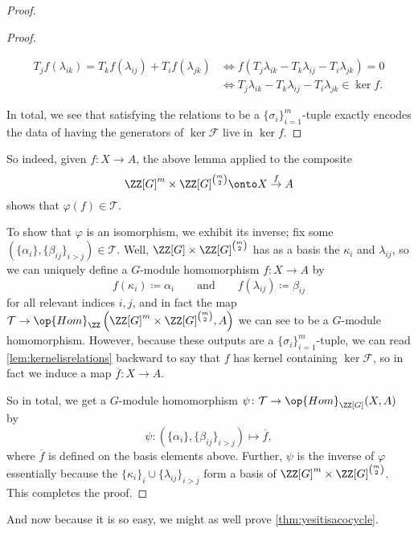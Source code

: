 \documentclass{article}
\numberwithin{equation}{section}
\begin{document}
\begin{proof}
\begin{proof}
\begin{enumerate}
			\begin{align*}
				T_jf(\lambda_{ik})=T_kf(\lambda_{ij})+T_if(\lambda_{jk}) &\iff f(T_j\lambda_{ik}-T_k\lambda_{ij}-T_i\lambda_{jk})=0 \\
				&\iff T_j\lambda_{ik}-T_k\lambda_{ij}-T_i\lambda_{jk}\in\ker f.
			\end{align*}
		\end{enumerate}
		In total, we see that satisfying the relations to be a $\{\sigma_i\}_{i=1}^m$-tuple exactly encodes the data of having the generators of $\ker\mathcal F$ live in $\ker f$.
	\end{proof}
	So indeed, given $f\colon X\to A$, the above lemma applied to the composite
	\[\ZZ[G]^m\times\ZZ[G]^{\binom m2}\onto X\stackrel{f}\to A\]
	shows that $\varphi(f)\in\mathcal T$.

	To show that $\varphi$ is an isomorphism, we exhibit its inverse; fix some $(\{\alpha_i\},\{\beta_{ij}\}_{i>j})\in\mathcal T$. Well, $\ZZ[G]\times\ZZ[G]^{\binom m2}$ has as a basis the $\kappa_i$ and $\lambda_{ij}$, so we can uniquely define a $G$-module homomorphism $f\colon X\to A$ by
	\[f(\kappa_i)\coloneqq\alpha_i\qquad\text{and}\qquad f(\lambda_{ij})\coloneqq\beta_{ij}\]
	for all relevant indices $i,j$, and in fact the map $\mathcal T\to\op{Hom}_\ZZ\left(\ZZ[G]^m\times\ZZ[G]^{\binom m2},A\right)$ we can see to be a $G$-module homomorphism. However, because these outputs are a $\{\sigma_i\}_{i=1}^m$-tuple, we can read \autoref{lem:kernelisrelations} backward to say that $f$ has kernel containing $\ker\mathcal F$, so in fact we induce a map $\overline f\colon X\to A$.
	
	So in total, we get a $G$-module homomorphism $\psi\colon\mathcal T\to\op{Hom}_{\ZZ[G]}(X,A)$ by
	\[\psi\colon(\{\alpha_i\},\{\beta_{ij}\}_{i>j})\mapsto\overline f,\]
	where $\overline f$ is defined on the basis elements above. Further, $\psi$ is the inverse of $\varphi$ essentially because the $\{\kappa_i\}_i\cup\{\lambda_{ij}\}_{i>j}$ form a basis of $\ZZ[G]^m\times\ZZ[G]^{\binom m2}$. This completes the proof.
\end{proof}
And now because it is so easy, we might as well prove \autoref{thm:yesitisacocycle}.
\thmyesitisacocycle*
\end{document}
